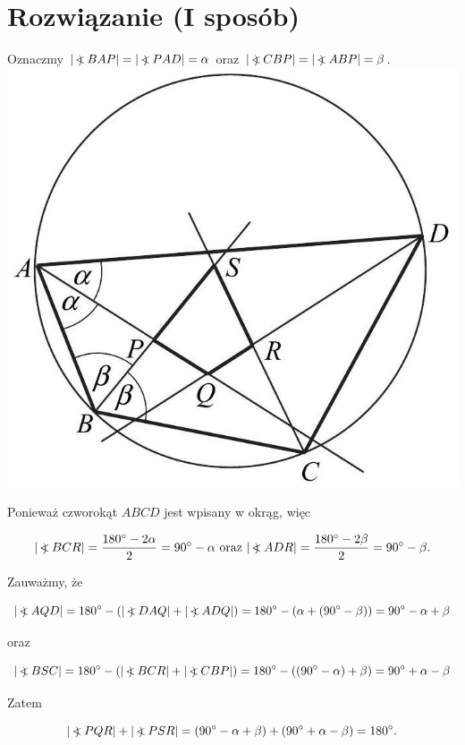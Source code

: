 \documentclass[10pt]{article}
\newcommand\Varangle{\mathop{{<\!\!\!\!\!\text{\small)}}\:}\nolimits}
\begin{document}
\section*{Rozwiązanie (I sposób)}
Oznaczmy $|\Varangle B A P|=|\Varangle P A D|=\alpha$ oraz $|\Varangle C B P|=|\Varangle A B P|=\beta$.\\
\includegraphics[max width=\textwidth, center]{2025_02_07_f5f4e8f37e6baab02e47g-07(1)}

Ponieważ czworokąt $A B C D$ jest wpisany w okrąg, więc

$$
|\Varangle B C R|=\frac{180^{\circ}-2 \alpha}{2}=90^{\circ}-\alpha \text { oraz }|\Varangle A D R|=\frac{180^{\circ}-2 \beta}{2}=90^{\circ}-\beta .
$$

Zauważmy, że

$$
|\Varangle A Q D|=180^{\circ}-(|\Varangle D A Q|+|\Varangle A D Q|)=180^{\circ}-\left(\alpha+\left(90^{\circ}-\beta\right)\right)=90^{\circ}-\alpha+\beta
$$

oraz

$$
|\Varangle B S C|=180^{\circ}-(|\Varangle B C R|+|\Varangle C B P|)=180^{\circ}-\left(\left(90^{\circ}-\alpha\right)+\beta\right)=90^{\circ}+\alpha-\beta
$$

Zatem

$$
|\Varangle P Q R|+|\Varangle P S R|=\left(90^{\circ}-\alpha+\beta\right)+\left(90^{\circ}+\alpha-\beta\right)=180^{\circ} .
$$
\end{document}

